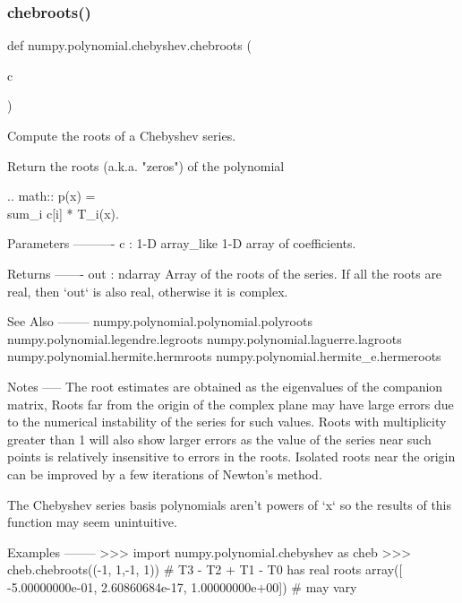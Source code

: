 \subsubsection{\texorpdfstring{chebroots()}{chebroots()}}
{\footnotesize\ttfamily def numpy.\+polynomial.\+chebyshev.\+chebroots (\begin{DoxyParamCaption}\item[{}]{c }\end{DoxyParamCaption})}

\begin{DoxyVerb}Compute the roots of a Chebyshev series.

Return the roots (a.k.a. "zeros") of the polynomial

.. math:: p(x) = \\sum_i c[i] * T_i(x).

Parameters
----------
c : 1-D array_like
    1-D array of coefficients.

Returns
-------
out : ndarray
    Array of the roots of the series. If all the roots are real,
    then `out` is also real, otherwise it is complex.

See Also
--------
numpy.polynomial.polynomial.polyroots
numpy.polynomial.legendre.legroots
numpy.polynomial.laguerre.lagroots
numpy.polynomial.hermite.hermroots
numpy.polynomial.hermite_e.hermeroots

Notes
-----
The root estimates are obtained as the eigenvalues of the companion
matrix, Roots far from the origin of the complex plane may have large
errors due to the numerical instability of the series for such
values. Roots with multiplicity greater than 1 will also show larger
errors as the value of the series near such points is relatively
insensitive to errors in the roots. Isolated roots near the origin can
be improved by a few iterations of Newton's method.

The Chebyshev series basis polynomials aren't powers of `x` so the
results of this function may seem unintuitive.

Examples
--------
>>> import numpy.polynomial.chebyshev as cheb
>>> cheb.chebroots((-1, 1,-1, 1)) # T3 - T2 + T1 - T0 has real roots
array([ -5.00000000e-01,   2.60860684e-17,   1.00000000e+00]) # may vary\end{DoxyVerb}
 \mbox{\label{namespacenumpy_1_1polynomial_1_1chebyshev_af87a2ff163377e32886c2da91bdaf444}} 
